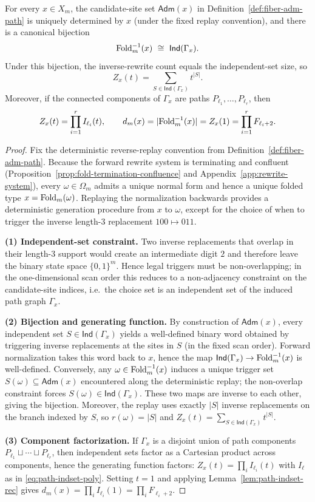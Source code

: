 \begin{theorem}\label{thm:fiber-indset-factorization}
For every $x\in X_m$, the candidate-site set $\mathsf{Adm}(x)$ in Definition~\ref{def:fiber-adm-path} is uniquely determined by $x$ (under the fixed replay convention), and there is a canonical bijection
\[
\Fold_m^{-1}(x)\ \cong\ \mathsf{Ind}(\Gamma_x).
\]
Under this bijection, the inverse-rewrite count equals the independent-set size, so
\[
Z_x(t)=\sum_{S\in \mathsf{Ind}(\Gamma_x)} t^{|S|}.
\]
Moreover, if the connected components of $\Gamma_x$ are paths $P_{\ell_1},\dots,P_{\ell_r}$, then
\[
Z_x(t)=\prod_{i=1}^r I_{\ell_i}(t),
\qquad
d_m(x)=|\mathrm{Fold}_m^{-1}(x)|=Z_x(1)=\prod_{i=1}^r F_{\ell_i+2}.
\]
\end{theorem}
\begin{proof}
Fix the deterministic reverse-replay convention from Definition~\ref{def:fiber-adm-path}.
Because the forward rewrite system is terminating and confluent (Proposition~\ref{prop:fold-termination-confluence} and Appendix~\ref{app:rewrite-system}), every $\omega\in\Omega_m$ admits a unique normal form and hence a unique folded type $x=\mathrm{Fold}_m(\omega)$.
Replaying the normalization backwards provides a deterministic generation procedure from $x$ to $\omega$, except for the choice of when to trigger the inverse length-$3$ replacement $100\mapsto 011$.
\par
\textbf{(1) Independent-set constraint.}
Two inverse replacements that overlap in their length-$3$ support would create an intermediate digit $2$ and therefore leave the binary state space $\{0,1\}^m$.
Hence legal triggers must be non-overlapping; in the one-dimensional scan order this reduces to a non-adjacency constraint on the candidate-site indices, i.e.\ the choice set is an independent set of the induced path graph $\Gamma_x$.
\par
\textbf{(2) Bijection and generating function.}
By construction of $\mathsf{Adm}(x)$, every independent set $S\in\mathsf{Ind}(\Gamma_x)$ yields a well-defined binary word obtained by triggering inverse replacements at the sites in $S$ (in the fixed scan order).
Forward normalization takes this word back to $x$, hence the map $\mathsf{Ind}(\Gamma_x)\to \mathrm{Fold}_m^{-1}(x)$ is well-defined.
Conversely, any $\omega\in\mathrm{Fold}_m^{-1}(x)$ induces a unique trigger set $S(\omega)\subseteq \mathsf{Adm}(x)$ encountered along the deterministic replay; the non-overlap constraint forces $S(\omega)\in\mathsf{Ind}(\Gamma_x)$.
These two maps are inverse to each other, giving the bijection.
Moreover, the replay uses exactly $|S|$ inverse replacements on the branch indexed by $S$, so $r(\omega)=|S|$ and $Z_x(t)=\sum_{S\in\mathsf{Ind}(\Gamma_x)}t^{|S|}$.
\par
\textbf{(3) Component factorization.}
If $\Gamma_x$ is a disjoint union of path components $P_{\ell_1}\sqcup\cdots\sqcup P_{\ell_r}$, then independent sets factor as a Cartesian product across components, hence the generating function factors:
\(
Z_x(t)=\prod_i I_{\ell_i}(t)
\)
with $I_\ell$ as in \eqref{eq:path-indset-poly}.
Setting $t=1$ and applying Lemma~\ref{lem:path-indset-rec} gives $d_m(x)=\prod_i I_{\ell_i}(1)=\prod_i F_{\ell_i+2}$.
\end{proof}

